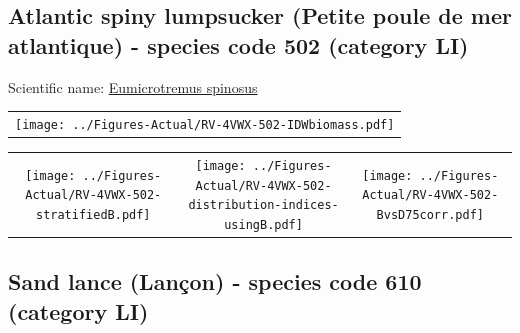 \documentclass[12pt]{article}\usepackage[]{graphicx}\usepackage[]{color}
\begin{document}
\renewcommand\thefigure{\thesubsection\Alph{figure}}

\setcounter{figure}{0}

\hypertarget{sec:502}{%
\subsection{Atlantic spiny lumpsucker (Petite poule de mer atlantique) - species code 502 (category LI)}\label{sec:502}}

  


Scientific name: \href{http://www.marinespecies.org/aphia.php?p=taxdetails\&id=127217}{Eumicrotremus spinosus} \newline
\begin{minipage}{1.0\textwidth}
 \begin{tabular}{c}
\texttt{[image: ../Figures-Actual/RV-4VWX-502-IDWbiomass.pdf]} \\ 
\end{tabular} 
\end{minipage}
\newline

\vspace{1cm}
\begin{minipage}{1.0\textwidth}
 \begin{tabular}{ccc}
\texttt{[image: ../Figures-Actual/RV-4VWX-502-stratifiedB.pdf]} & 
\texttt{[image: ../Figures-Actual/RV-4VWX-502-distribution-indices-usingB.pdf]} & 
\texttt{[image: ../Figures-Actual/RV-4VWX-502-BvsD75corr.pdf]} \\ 
\end{tabular} 
\end{minipage}
\clearpage

\renewcommand\thefigure{\thesubsection\Alph{figure}}

\setcounter{figure}{0}

\hypertarget{sec:610}{%
\subsection{Sand lance (Lançon) - species code 610 (category LI)}\label{sec:610}}
\end{document}
